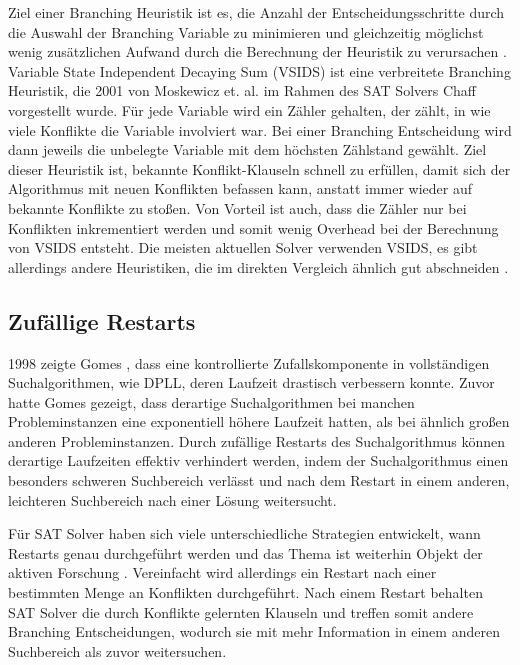 \documentclass[conference,compsoc,final,a4paper]{IEEEtran}
\begin{document}
Ziel einer Branching Heuristik ist es, die Anzahl der Entscheidungsschritte durch die Auswahl der Branching Variable zu minimieren und gleichzeitig möglichst wenig zusätzlichen Aufwand durch die Berechnung der Heuristik zu verursachen \cite{anatomy_of_modern_sat_solvers}. Variable State Independent Decaying Sum (VSIDS) ist eine verbreitete Branching Heuristik, die 2001 von Moskewicz et. al. \cite{chaff_engineering} im Rahmen des SAT Solvers Chaff vorgestellt wurde. Für jede Variable wird ein Zähler gehalten, der zählt, in wie viele Konflikte die Variable involviert war. Bei einer Branching Entscheidung wird dann jeweils die unbelegte Variable mit dem höchsten Zählstand gewählt. Ziel dieser Heuristik ist, bekannte Konflikt-Klauseln schnell zu erfüllen, damit sich der Algorithmus mit neuen Konflikten befassen kann, anstatt immer wieder auf bekannte Konflikte zu stoßen. Von Vorteil ist auch, dass die Zähler nur bei Konflikten inkrementiert werden und somit wenig Overhead bei der Berechnung von VSIDS entsteht. \cite{anatomy_of_modern_sat_solvers} Die meisten aktuellen Solver verwenden VSIDS, es gibt allerdings andere Heuristiken, die im direkten Vergleich ähnlich gut abschneiden \cite{sat_solving_techniques_biliography}.

\subsection{Zufällige Restarts}
1998 zeigte Gomes \cite{gomes_search_randomization}, dass eine kontrollierte Zufallskomponente in vollständigen Suchalgorithmen, wie DPLL, deren Laufzeit drastisch verbessern konnte. Zuvor hatte Gomes gezeigt, dass derartige Suchalgorithmen bei manchen Probleminstanzen eine exponentiell höhere Laufzeit hatten, als bei ähnlich großen anderen Probleminstanzen. Durch zufällige Restarts des Suchalgorithmus können derartige Laufzeiten effektiv verhindert werden, indem der Suchalgorithmus einen besonders schweren Suchbereich verlässt und nach dem Restart in einem anderen, leichteren Suchbereich nach einer Lösung weitersucht. \cite{gomes_search_randomization}

Für SAT Solver haben sich viele unterschiedliche Strategien entwickelt, wann Restarts genau durchgeführt werden und das Thema ist weiterhin Objekt der aktiven Forschung \cite{sat_solving_techniques_biliography}. Vereinfacht wird allerdings ein Restart nach einer bestimmten Menge an Konflikten durchgeführt. Nach einem Restart behalten SAT Solver die durch Konflikte gelernten Klauseln und treffen somit andere Branching Entscheidungen, wodurch sie mit mehr Information in einem anderen Suchbereich als zuvor weitersuchen. \cite{anatomy_of_modern_sat_solvers}
\end{document}
